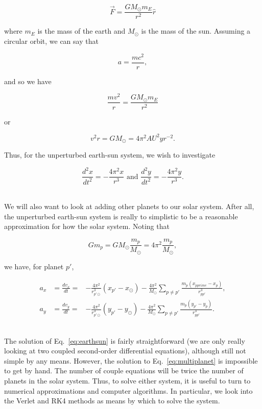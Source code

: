 \documentclass[12pt]{article}
\numberwithin{equation}{section}
\begin{document}
\begin{equation}
\label{eq:earthsunbigg}
\vec{F} = \frac{GM_{\odot}m_{E}}{r^{2}}\hat{r}
\end{equation}

\noindent where $m_{E}$ is the mass of the earth and $M_{\odot}$ is the mass of the sun.  Assuming a circular orbit, we can say that 

$$a = \frac{mc^{2}}{r},$$

\noindent and so we have

$$\frac{mv^{2}}{r} = \frac{GM_{\odot}m_{E}}{r^{2}}$$

\noindent or

$$v^{2}r = GM_{\odot} = 4\pi^{2} AU^{2}yr^{-2}.$$

\noindent Thus, for the unperturbed earth-sun system, we wish to investigate

\begin{equation}
\label{eq:earthsun}
\frac{d^{2}x}{dt^{2}} = -\frac{4\pi^{2}x}{r^{3}} \text{ and } \frac{d^{2}y}{dt^{2}} = -\frac{4\pi^{2}y}{r^{3}}.
\end{equation}

\\\indent We will also want to look at adding other planets to our solar system.  After all, the unperturbed earth-sun system is really to simplistic to be a reasonable approximation for how the solar system.  Noting that

$$Gm_{p} = GM_{\odot}\frac{m_{p}}{M_{\odot}}=4\pi^{2}\frac{m_{p}}{M_{\odot}},$$

\noindent we have, for planet $p\prime$,

\begin{equation}
\label{eq:multiplanet}
\begin{align}
a_{x} &=  \frac{dv_{x}}{dt} =&  -\frac{4\pi^{2}}{r_{p\prime\odot}^{3}}\left(x_{p\prime} - x_{\odot}\right) - \frac{4\pi^{2}}{M_{\odot}}\sum_{p\neq p\prime}\frac{m_{p}\left(x_{pprime} - x_{p}\right)}{r_{pp\prime}^{3}}, \\
a_{y} &=  \frac{dv_{y}}{dt} =&  -\frac{4\pi^{2}}{r_{p\prime\odot}^{3}}\left(y_{p\prime} - y_{\odot}\right) - \frac{4\pi^{2}}{M_{\odot}}\sum_{p\neq p\prime}\frac{m_{p}\left(y_{p\prime} - y_{p}\right)}{r_{pp\prime}^{3}}.
\end{align}
\end{equation}

\\\indent The solution of Eq.~\ref{eq:earthsun} is fairly straightforward (we are only really looking at two coupled second-order differential equations), although still not simple by any means.  However, the solution to Eq.~\ref{eq:multiplanet} is impossible to get by hand.  The number of couple equations will be twice the number of planets in the solar system.  Thus, to solve either system, it is useful to turn to numerical approximations and computer algorithms.  In particular, we look into the Verlet and RK4 methods as means by which to solve the system.
\end{document}
